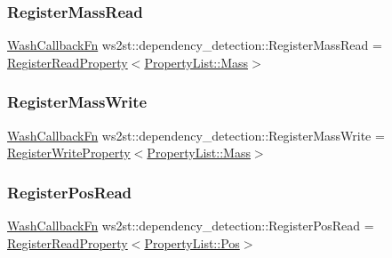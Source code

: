 \subsubsection{\texorpdfstring{Register\+Mass\+Read}{RegisterMassRead}}
{\footnotesize\ttfamily \mbox{\hyperlink{namespacews2st_a682dfda40d8282c7e579a7b826a7d861}{Wash\+Callback\+Fn}} ws2st\+::dependency\+\_\+detection\+::\+Register\+Mass\+Read = \mbox{\hyperlink{namespacews2st_1_1dependency__detection_aa071e67a31629c2fff6e3d16a9eed42d}{Register\+Read\+Property}}$<$\mbox{\hyperlink{namespacews2st_1_1dependency__detection_abcddd986f080a9e5c494edfad3c3faf7aff2864d6f652ee0ac254814f1ae4f4a8}{Property\+List\+::\+Mass}}$>$}

\mbox{\label{namespacews2st_1_1dependency__detection_aebfe4d8af9a8016c15adb62289ed4518}} 
\subsubsection{\texorpdfstring{Register\+Mass\+Write}{RegisterMassWrite}}
{\footnotesize\ttfamily \mbox{\hyperlink{namespacews2st_a682dfda40d8282c7e579a7b826a7d861}{Wash\+Callback\+Fn}} ws2st\+::dependency\+\_\+detection\+::\+Register\+Mass\+Write = \mbox{\hyperlink{namespacews2st_1_1dependency__detection_a37100c3e1b7e8038aff533d343905484}{Register\+Write\+Property}}$<$\mbox{\hyperlink{namespacews2st_1_1dependency__detection_abcddd986f080a9e5c494edfad3c3faf7aff2864d6f652ee0ac254814f1ae4f4a8}{Property\+List\+::\+Mass}}$>$}

\mbox{\label{namespacews2st_1_1dependency__detection_a4a262f1e91bcf841fc88097d8d1ca173}} 
\subsubsection{\texorpdfstring{Register\+Pos\+Read}{RegisterPosRead}}
{\footnotesize\ttfamily \mbox{\hyperlink{namespacews2st_a682dfda40d8282c7e579a7b826a7d861}{Wash\+Callback\+Fn}} ws2st\+::dependency\+\_\+detection\+::\+Register\+Pos\+Read = \mbox{\hyperlink{namespacews2st_1_1dependency__detection_aa071e67a31629c2fff6e3d16a9eed42d}{Register\+Read\+Property}}$<$\mbox{\hyperlink{namespacews2st_1_1dependency__detection_abcddd986f080a9e5c494edfad3c3faf7afea4e0fe069dc6f6171dd6044abb2365}{Property\+List\+::\+Pos}}$>$}

